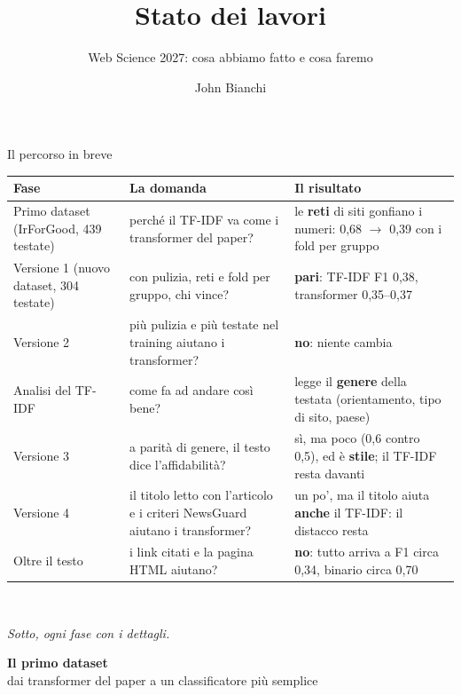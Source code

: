 \documentclass[aspectratio=169]{beamer}
\title[Stato dei lavori]{Stato dei lavori}
\subtitle{Web Science 2027: cosa abbiamo fatto e cosa faremo}
\author[John Bianchi]{John Bianchi}
\institute[]{IMT Lucca \& IIT-CNR Pisa}
\date{}
\newcommand{\hl}[1]{\textbf{#1}}
\newcommand{\divider}[2]{%
  \begin{frame}[plain]
    \vfill
    \begin{center}
      {\color{dividerblue}\Huge\textbf{#1}}\\[0.8em]
      {\large #2}
    \end{center}
    \vfill
  \end{frame}}
\begin{document}
\begin{frame}
  \titlepage
\end{frame}

\begin{frame}{Il percorso in breve}
  \centering\scriptsize
  \begin{tabular}{>{\raggedright\arraybackslash}p{}>{\raggedright\arraybackslash}p{}>{\raggedright\arraybackslash}p{}}
    \toprule
    \textbf{Fase} & \textbf{La domanda} & \textbf{Il risultato} \\
    \midrule
    Primo dataset (IrForGood, 439 testate) & perch\'e il TF-IDF va come i transformer del paper? & le \hl{reti} di siti gonfiano i numeri: 0,68 $\to$ 0,39 con i fold per gruppo \\
    \addlinespace
    Versione 1 (nuovo dataset, 304 testate) & con pulizia, reti e fold per gruppo, chi vince? & \hl{pari}: TF-IDF F1 0,38, transformer 0,35--0,37 \\
    \addlinespace
    Versione 2 & pi\`u pulizia e pi\`u testate nel training aiutano i transformer? & \hl{no}: niente cambia \\
    \addlinespace
    Analisi del TF-IDF & come fa ad andare cos\`i bene? & legge il \hl{genere} della testata (orientamento, tipo di sito, paese) \\
    \addlinespace
    Versione 3 & a parit\`a di genere, il testo dice l'affidabilit\`a? & s\`i, ma poco (0,6 contro 0,5), ed \`e \hl{stile}; il TF-IDF resta davanti \\
    \addlinespace
    Versione 4 & il titolo letto con l'articolo e i criteri NewsGuard aiutano i transformer? & un po', ma il titolo aiuta \hl{anche} il TF-IDF: il distacco resta \\
    \addlinespace
    Oltre il testo & i link citati e la pagina HTML aiutano? & \hl{no}: tutto arriva a F1 circa 0,34, binario circa 0,70 \\
    \bottomrule
  \end{tabular}\\[0.6em]
  \raggedright{\small\itshape Sotto, ogni fase con i dettagli.}
\end{frame}

\divider{Il primo dataset}{dai transformer del paper a un classificatore pi\`u semplice}
\end{document}
